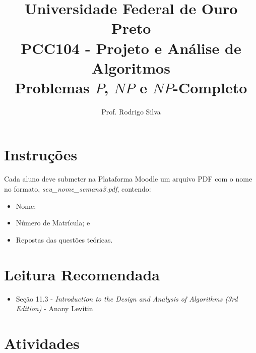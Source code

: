 \documentclass{article}
\title{\vspace{-2 cm}Universidade Federal de Ouro Preto \\ PCC104 - Projeto e Análise de Algoritmos \\ Problemas $P$, $NP$ e $NP$-Completo}
\author{Prof. Rodrigo Silva}
\begin{document}
\maketitle

\section*{Instruções}

Cada aluno deve submeter na Plataforma Moodle um arquivo PDF com o nome no formato, \textit{seu\_nome\_semana3.pdf}, contendo:
\begin{itemize}
    \item Nome;
    \item Número de Matrícula; e
    \item Repostas das questões teóricas.
\end{itemize}

\section{Leitura Recomendada}

\begin{itemize}
    \item Seção 11.3 - \textit{Introduction to the Design and Analysis of Algorithms (3rd Edition)} - Anany Levitin 
\end{itemize}

\section{Atividades}
\end{document}
